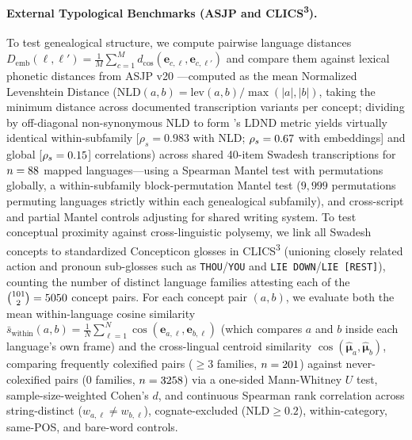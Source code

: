 \paragraph{External Typological Benchmarks (ASJP and CLICS\textsuperscript{3}).}
To test genealogical structure, we compute pairwise language distances $D_{\text{emb}}(\ell, \ell') = \frac{1}{M}\sum_{c=1}^{M} d_{\cos}(\mathbf{e}_{c,\ell}, \mathbf{e}_{c,\ell'})$ and compare them against lexical phonetic distances from ASJP v20 \citep{wichmann2022,jaeger2018}—computed as the mean Normalized Levenshtein Distance ($\text{NLD}(a,b) = \text{lev}(a,b)/\max(|a|,|b|)$, taking the minimum distance across documented transcription variants per concept; dividing by off-diagonal non-synonymous NLD to form \citeauthor{jaeger2018}'s \citeyear{jaeger2018} LDND metric yields virtually identical within-subfamily [$\rho_s = 0.983$ with NLD; $\rho_s = 0.67{}$ with embeddings] and global [$\rho_s = 0.15{}$] correlations) across shared 40-item Swadesh transcriptions for $n = 88{}$ mapped languages—using a Spearman Mantel test with \MantelPermutations{} permutations globally, a within-subfamily block-permutation Mantel test ($9{,}999$ permutations permuting languages strictly within each genealogical subfamily), and cross-script and partial Mantel controls adjusting for shared writing system.
To test conceptual proximity against cross-linguistic polysemy, we link all \NumConcepts{} Swadesh concepts to standardized Concepticon glosses in CLICS\textsuperscript{3} \citep{list2018,rzymski2020} (unioning closely related action and pronoun sub-glosses such as \texttt{THOU}/\texttt{YOU} and \texttt{LIE DOWN}/\texttt{LIE [REST]}), counting the number of distinct language families attesting each of the $\binom{101}{2} = 5050{}$ concept pairs.
For each concept pair $(a,b)$, we evaluate both the mean within-language cosine similarity $\bar{s}_{\text{within}}(a,b) = \frac{1}{N}\sum_{\ell=1}^{N}\cos(\mathbf{e}_{a,\ell}, \mathbf{e}_{b,\ell})$ (which compares $a$ and $b$ inside each language's own frame) and the cross-lingual centroid similarity $\cos(\hat{\boldsymbol{\mu}}_a, \hat{\boldsymbol{\mu}}_b)$, comparing frequently colexified pairs ($\ge 3$ families, $n = 201{}$) against never-colexified pairs ($0$ families, $n = 3258{}$) via a one-sided Mann-Whitney $U$ test, sample-size-weighted Cohen's $d$, and continuous Spearman rank correlation across string-distinct ($w_{a,\ell} \neq w_{b,\ell}$), cognate-excluded ($\text{NLD} \ge 0.2$), within-category, same-POS, and bare-word controls.


